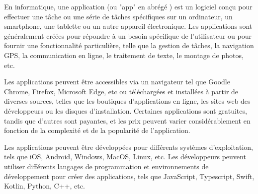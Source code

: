 En informatique, une application (ou "app" en abrégé ) est un logiciel conçu pour effectuer une tâche ou une série de tâches spécifiques sur un ordinateur, un smartphone, une tablette ou un autre appareil électronique. Les applications sont généralement créées pour répondre à un besoin spécifique de l'utilisateur ou pour fournir une fonctionnalité particulière, telle que la gestion de tâches, la navigation GPS, la communication en ligne, le traitement de texte, le montage de photos, etc.

Les applications peuvent être accessibles via un navigateur tel que Goodle Chrome, Firefox, Microsoft Edge, etc ou téléchargées et installées à partir de diverses sources, telles que les boutiques d'applications en ligne, les sites web des développeurs ou les disques d'installation. Certaines applications sont gratuites, tandis que d'autres sont payantes, et les prix peuvent varier considérablement en fonction de la complexité et de la popularité de l'application.

Les applications peuvent être développées pour différents systèmes d'exploitation, tels que iOS, Android, Windows, MacOS, Linux, etc. Les développeurs peuvent utiliser différents langages de programmation et environnements de développement pour créer des applications, tels que JavaScript, Typescript, Swift, Kotlin, Python, C++, etc.
